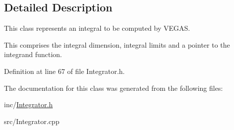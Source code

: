 \subsection{Detailed Description}
This class represents an integral to be computed by V\+E\+G\+A\+S. 

This comprises the integral dimension, integral limits and a pointer to the integrand function. 

Definition at line 67 of file Integrator.\+h.



The documentation for this class was generated from the following files\+:\begin{DoxyCompactItemize}
\item 
inc/\hyperlink{Integrator_8h}{Integrator.\+h}\item 
src/Integrator.\+cpp\end{DoxyCompactItemize}

